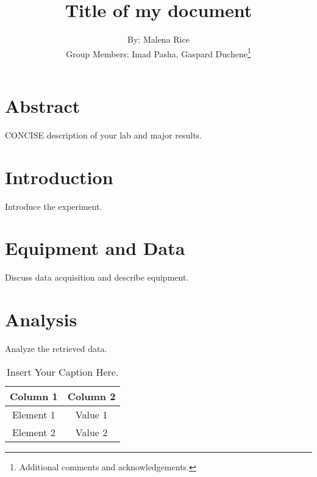 \documentclass[12pt]{article}
\begin{document}
 
\title{\vspace{-2cm} Title of my document \vspace{-0.6cm} }
\author{By: Malena Rice \\ Group Members: Imad Pasha, Gaspard Duchene\thanks{Additional comments and acknowledgements.}}
\date{}
\maketitle

\vspace{-0.5cm}

\begin{multicols}{2}

\section{Abstract}
CONCISE description of your lab and major results.

\section{Introduction}
Introduce the experiment.

\section{Equipment and Data}
Discuss data acquisition and describe equipment.

\section{Analysis}
Analyze the retrieved data.

\vspace{2mm}
\begin{table}[H]
\begin{center}
\begin{tabular}{| c | c |}
\hline
\textbf{Column 1} & \textbf{Column 2} \\ \hline %
Element 1 & Value 1 \\ \hline
Element 2 & Value 2  \\ \hline
\end{tabular}
\caption{Insert Your Caption Here.}
\label{tab:size_categories}
\end{center}
\end{table}


\end{multicols}
\end{document}
